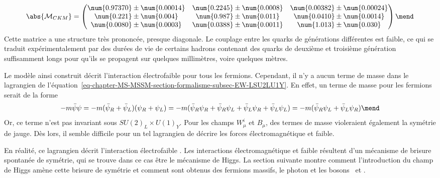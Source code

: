 \begin{equation}
\abs{\mathcal{M}_{CKM}} = 
\begin{pmatrix}
\num{0.97370}\pm\num{0.00014} & \num{0.2245}\pm\num{0.0008} & \num{0.00382}\pm\num{0.00024} \\
\num{0.221}\pm\num{0.004} & \num{0.987}\pm\num{0.011} & \num{0.0410}\pm\num{0.0014} \\
\num{0.0080}\pm\num{0.0003} & \num{0.0388}\pm\num{0.0011} & \num{1.013}\pm\num{0.030} 
\end{pmatrix}
\mend
\end{equation}
Cette matrice a une structure très prononcée, presque diagonale. Le couplage entre les quarks de générations différentes est faible, ce qui se traduit expérimentalement par des durées de vie de certains hadrons contenant des quarks de deuxième et troisième génération suffisamment longs pour qu'ils se propagent sur quelques millimètres, voire quelques mètres.
\par Le modèle ainsi construit décrit l'interaction électrofaible pour tous les fermions.
Cependant, il n'y a aucun terme de masse dans le lagrangien de l'équation~\eqref{eq-chapter-MS-MSSM-section-formalisme-subsec-EW-LSU2LU1Y}. En effet, un terme de masse pour les fermions serait de la forme
\begin{equation}
-m\bar{\psi}\psi
=
-m (\bar{\psi}_R+\bar{\psi}_L)(\psi_R+\psi_L)
=
-m (
\bar{\psi}_R \psi_R
+\bar{\psi}_R \psi_L
+\bar{\psi}_L \psi_R
+\bar{\psi}_L \psi_L
)
=
-m (\bar{\psi}_R \psi_L + \bar{\psi}_L \psi_R)
\mend
\end{equation}
Or, ce terme n'est pas invariant sous $SU(2)_L\times U(1)_Y$.
Pour les champs $W^i_\mu$ et $B_\mu$, des termes de masse violeraient également la symétrie de jauge.
Dès lors, il semble difficile pour un tel lagrangien de décrire les forces électromagnétique et faible.
\par En réalité, ce lagrangien décrit l'interaction \og électrofaible \fg.
Les interactions électromagnétique et faible résultent d'un mécanisme de brisure spontanée de symétrie, qui se trouve dans ce cas être le mécanisme de Higgs.
La section suivante montre comment l'introduction du champ de Higgs amène cette brisure de symétrie et comment sont obtenus des fermions massifs, le photon et les bosons \Wbosonpm\ et \Zboson.
